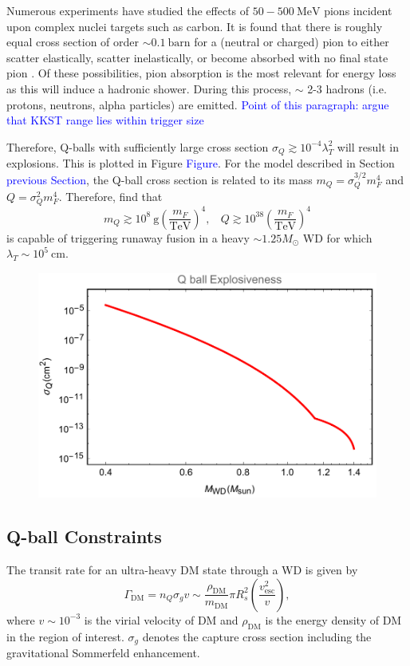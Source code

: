 \documentclass[twocolumn,showpacs,preprintnumbers,amsmath,amssymb,prd]{revtex4}
\def\r{\right)}
\def\l{\left(}
\begin{document}
Numerous experiments have studied the effects of $50 - 500 ~\text{MeV}$ pions incident upon complex nuclei targets such as carbon. It is found that there is roughly equal cross section of order $\sim 0.1 ~\text{barn}$ for a (neutral or charged) pion to either scatter elastically, scatter inelastically, or become absorbed with no final state pion \cite{Pionnuclear}. Of these possibilities, pion absorption is the most relevant for energy loss as this will induce a hadronic shower. During this process, $\sim$ 2-3 hadrons (i.e. protons, neutrons, alpha particles) are emitted. \textcolor{blue}{Point of this paragraph: argue that KKST range lies within trigger size}

Therefore, Q-balls with sufficiently large cross section $\sigma_Q \gtrsim 10^{-4} \lambda_T^2$ will result in explosions. This is plotted in Figure \textcolor{blue}{Figure}. For the model described in Section \textcolor{blue}{previous Section}, the Q-ball cross section is related to its mass $m_Q = \sigma_Q^{3/2} m_F^4$ and $Q = \sigma_Q^2 m_F^4$. Therefore, find that
\begin{equation}
m_Q \gtrsim 10^8 ~\text{g} \l\frac{m_F}{\text{TeV}}\r^4, ~~~~ Q \gtrsim 10^{38} \l\frac{m_F}{\text{TeV}}\r^4
\end{equation}
is capable of triggering runaway fusion in a heavy $\sim 1.25 M_{\odot}$ WD for which $\lambda_T \sim 10^5 ~\text{cm}$.

\begin{figure}
\includegraphics[scale=.45]{boomQball.pdf}
\end{figure}


\subsection{Q-ball Constraints}
The transit rate for an ultra-heavy DM state through a WD is given by
\begin{equation}
\Gamma_\text{DM} = n_Q \sigma_g v \sim \frac{\rho_{\text{DM}}}{m_\text{DM}} \pi R_{s}^2 \l\frac{v_\text{esc}^2}{v}\r,
\end{equation}
where $v \sim 10^{-3}$ is the virial velocity of DM and $\rho_{\text{DM}}$ is the energy density of DM in the region of interest. $\sigma_g$ denotes the capture cross section including the gravitational Sommerfeld enhancement.
\end{document}
